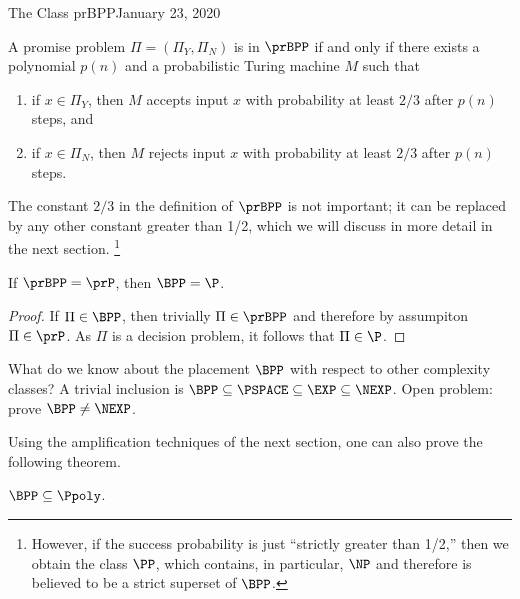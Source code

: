 \begin{lecture}{1}{The Class prBPP}{January 23, 2020}
\begin{definition}[$\prBPP$]
  A promise problem $\Pi = (\Pi_Y, \Pi_N)$ is in $\prBPP$ if and only if there
  exists a polynomial $p(n)$ and a probabilistic Turing machine $M$ such that
  \begin{enumerate}
    \item if $x \in \Pi_Y$, then $M$ accepts input $x$ with probability at
      least $2/3$ after $p(n)$ steps, and
    \item if $x \in \Pi_N$, then $M$ rejects input $x$ with probability at
      least $2/3$ after $p(n)$ steps.
  \end{enumerate}
\end{definition}

The constant $2/3$ in the definition of $\prBPP$ is not important; it
can be replaced by any other constant greater than 1/2, which we will discuss
in more detail in the next section.%
\footnote{However, if the success probability is just ``strictly greater than
1/2,'' then we obtain the class $\PP$, which contains, in particular, $\NP$ and
therefore is believed to be a strict superset of $\BPP$.}

\begin{proposition}
  If $\prBPP = \prP$, then $\BPP = \P$.
\end{proposition}

\begin{proof}
  If $\Pi \in \BPP$, then trivially $\Pi \in \prBPP$ and therefore by
  assumpiton $\Pi \in \prP$. As $\Pi$ is a decision problem, it follows
  that $\Pi \in \P$.
\end{proof}

What do we know about the placement $\BPP$ with respect to other complexity
classes? A trivial inclusion is $\BPP \subseteq \PSPACE \subseteq \EXP
\subseteq \NEXP$. Open problem: prove $\BPP \ne \NEXP$.

Using the amplification techniques of the next section, one can also prove
the following theorem.

\begin{theorem}
  $\BPP \subseteq \Ppoly$.
\end{theorem}



\end{lecture}

